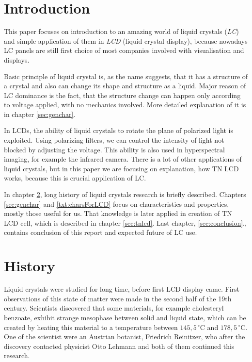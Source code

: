 \section{Introduction}
This paper focuses on introduction to an amazing world of liquid crystals (\emph{LC}) and simple application of them in \emph{LCD} (liquid crystal display), because nowadays LC panels are still first choice of most companies involved with visualisation and displays.

Basic principle of liquid crystal is, as the name suggests, that it has a structure of a crystal and also can change its shape and structure as a liquid. Major reason of LC dominance is the fact, that the structure change can happen only according to voltage applied, with no mechanics involved. More detailed explanation of it is in chapter \ref{sec:genchar}. 

In LCDs, the ability of liquid crystals to rotate the plane of polarized light is exploited. Using polarizing filters, we can control the intensity of light not blocked by adjusting the voltage. This ability is also used in hyperspectral imaging, for example the infrared camera. There is a lot of other applications of liquid crystals, but in this paper we are focusing on explanation, how TN LCD works, because this is crucial application of LC.

In chapter \ref{sec:history}, long history of liquid crystals research is briefly described. Chapters \ref{sec:genchar} and \ref{txt:charsForLCD} focus on characteristics and properties, mostly those useful for us. That knowledge is later applied in creation of TN LCD cell, which is described in chapter \ref{sec:tnlcd}. Last chapter, \ref{sec:conclusion}., contains conclusion of this report and expected future of LC use.

\section{History}
\label{sec:history}
Liquid crystals were studied for long time, before first LCD display came. First observations of this state of matter were made in the second half of the 19th century. Scientists discovered that some materials, for example cholesteryl benzoate, exhibit strange mesophase between solid and liquid state, which can be created by heating this material to a temperature between $145,5\,^{\circ}\mathrm{C}$  and $178,5\,^{\circ}\mathrm{C}$. \cite{kawamoto2002history} One of the scientist were an Austrian botanist, Friedrich Reinitzer, who after the discovery contacted physicist Otto Lehmann and both of them continued this research.

